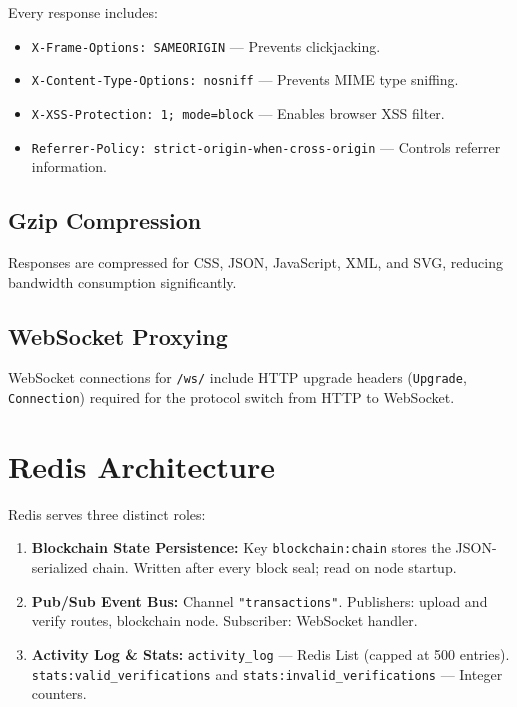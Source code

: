 \documentclass[12pt, a4paper]{report}
\begin{document}
Every response includes:
\begin{itemize}
    \item \texttt{X-Frame-Options: SAMEORIGIN} — Prevents clickjacking.
    \item \texttt{X-Content-Type-Options: nosniff} — Prevents MIME type sniffing.
    \item \texttt{X-XSS-Protection: 1; mode=block} — Enables browser XSS filter.
    \item \texttt{Referrer-Policy: strict-origin-when-cross-origin} — Controls
          referrer information.
\end{itemize}

\subsection{Gzip Compression}

Responses are compressed for CSS, JSON, JavaScript, XML, and SVG, reducing
bandwidth consumption significantly.

\subsection{WebSocket Proxying}

WebSocket connections for \texttt{/ws/} include HTTP upgrade headers
(\texttt{Upgrade}, \texttt{Connection}) required for the protocol switch
from HTTP to WebSocket.

\section{Redis Architecture}

Redis serves three distinct roles:

\begin{enumerate}
    \item \textbf{Blockchain State Persistence:}
    Key \texttt{blockchain:chain} stores the JSON-serialized chain.
    Written after every block seal; read on node startup.

    \item \textbf{Pub/Sub Event Bus:}
    Channel \texttt{"transactions"}. Publishers: upload and verify routes,
    blockchain node. Subscriber: WebSocket handler.

    \item \textbf{Activity Log \& Stats:}
    \texttt{activity\_log} — Redis List (capped at 500 entries).
    \texttt{stats:valid\_verifications} and
    \texttt{stats:invalid\_verifications} — Integer counters.
\end{enumerate}
\end{document}
